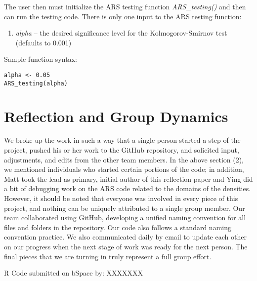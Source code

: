 \documentclass{article}
\begin{document}
The user then must initialize the ARS testing function \textit{ARS\_testing()} and then can run the testing code. There is only one input to the ARS testing function:
\begin{enumerate}
\item \textit{alpha} -- the desired significance level for the Kolmogorov-Smirnov test (defaults to 0.001)
\end{enumerate}
Sample function syntax:

\begin{lstlisting}
alpha <- 0.05
ARS_testing(alpha)
\end{lstlisting}

\section{Reflection and Group Dynamics}
We broke up the work in such a way that a single person started a step of the project, pushed his or her work to the GitHub repository, and solicited input, adjustments, and edits from the other team members.  In the above section (2), we mentioned individuals who started certain portions of the code; in addition, Matt took the lead as primary, initial author of this reflection paper and Ying did a bit of debugging work on the ARS code related to the domains of the densities.  However, it should be noted that everyone was involved in every piece of this project, and nothing can be uniquely attributed to a single group member.  Our team collaborated using GitHub, developing a unified naming convention for all files and folders in the repository. Our code also follows a standard naming convention practice.  We also communicated daily by email to update each other on our progress when the next stage of work was ready for the next person. The final pieces that we are turning in truly represent a full group effort. 

R Code submitted on bSpace by: XXXXXXX
\end{document}
